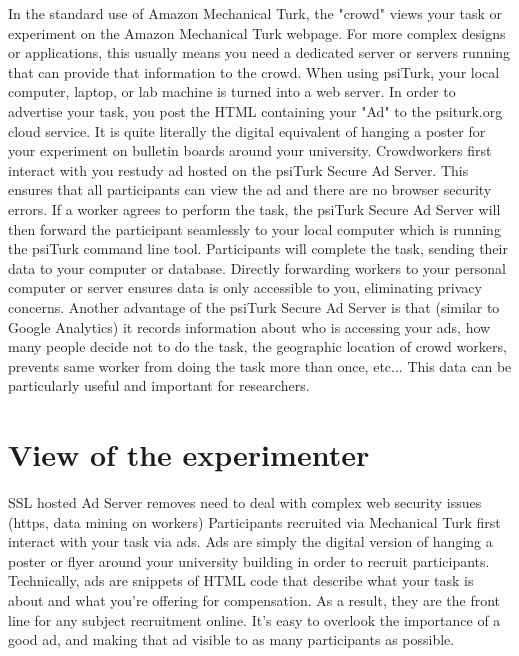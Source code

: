 \documentclass[jou,apacite]{apa6}
\begin{document}
In the standard use of Amazon Mechanical Turk, the "crowd" views your task or experiment on the Amazon Mechanical Turk webpage.
For more complex designs or applications, this usually means you need a dedicated server or servers running that can provide that information to the crowd.
When using psiTurk, your local computer, laptop, or lab machine is turned into a web server.
In order to advertise your task, you post the HTML containing your "Ad" to the psiturk.org cloud service.
It is quite literally the digital equivalent of hanging a poster for your experiment on bulletin boards around your university.
Crowdworkers first interact  with you restudy ad hosted on the psiTurk Secure Ad Server.
This ensures that all participants can view the ad and there are no browser security errors.
If a worker agrees to perform the task, the psiTurk Secure Ad Server will then forward the participant seamlessly to your local computer which is running the psiTurk command line tool.
Participants will complete the task, sending their data to your computer or database.
Directly forwarding workers to your personal computer or server ensures data is only accessible to you, eliminating privacy concerns.
Another advantage of the psiTurk Secure Ad Server is that (similar to Google Analytics) it records information about who is accessing your ads, how many people decide not to do the task, the geographic location of crowd workers, prevents same worker from doing the task more than once, etc... 
This data can be particularly useful and important for researchers. 


\section{View of the experimenter}
SSL hosted Ad Server removes need to deal with complex web security issues (https, data mining on workers) 
Participants recruited via Mechanical Turk first interact with your task via ads. Ads are simply the digital version of hanging a poster or flyer around your university building in order to recruit participants. Technically, ads are snippets of HTML code that describe what your task is about and what you're offering for compensation. As a result, they are the front line for any subject recruitment online. It's easy to overlook the importance of a good ad, and making that ad visible to as many participants as possible.
\end{document}
